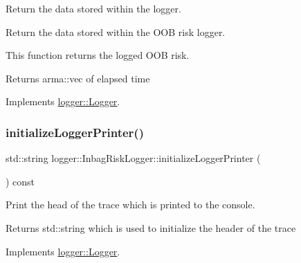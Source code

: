 Return the data stored within the logger. 

Return the data stored within the O\+OB risk logger.

This function returns the logged O\+OB risk.

\begin{DoxyReturn}{Returns}
{\ttfamily arma\+::vec} of elapsed time 
\end{DoxyReturn}


Implements \mbox{\hyperlink{classlogger_1_1_logger_aa4fc254c532172db3404b7c0bcd17092}{logger\+::\+Logger}}.

\mbox{\label{classlogger_1_1_inbag_risk_logger_ab793454f28dae8d0901852b41a910ec7}} 
\subsubsection{\texorpdfstring{initialize\+Logger\+Printer()}{initializeLoggerPrinter()}}
{\footnotesize\ttfamily std\+::string logger\+::\+Inbag\+Risk\+Logger\+::initialize\+Logger\+Printer (\begin{DoxyParamCaption}{ }\end{DoxyParamCaption}) const\hspace{0.3cm}{\ttfamily [virtual]}}



Print the head of the trace which is printed to the console. 

\begin{DoxyReturn}{Returns}
{\ttfamily std\+::string} which is used to initialize the header of the trace 
\end{DoxyReturn}


Implements \mbox{\hyperlink{classlogger_1_1_logger_a825f96e8564ac4013ff09ef842c0aeec}{logger\+::\+Logger}}.

\mbox{\label{classlogger_1_1_inbag_risk_logger_ad90612e1b684287a29bdbde1077d65d7}} 
